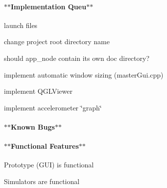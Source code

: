\paragraph*{$\ast$$\ast$\-Implementation Queu$\ast$$\ast$}


\begin{DoxyItemize}
\item launch files
\item change project root directory name
\item should {\ttfamily app\-\_\-node} contain its own {\ttfamily doc} directory?
\item implement automatic window sizing (master\-Gui.\-cpp)
\item implement {\ttfamily Q\-G\-L\-Viewer}
\item implement accelerometer \char`\"{}graph\char`\"{}
\end{DoxyItemize}

\paragraph*{$\ast$$\ast$\-Known Bugs$\ast$$\ast$}

\paragraph*{$\ast$$\ast$\-Functional Features$\ast$$\ast$}


\begin{DoxyItemize}
\item Prototype (G\-U\-I) is functional
\item Simulators are functional 
\end{DoxyItemize}
